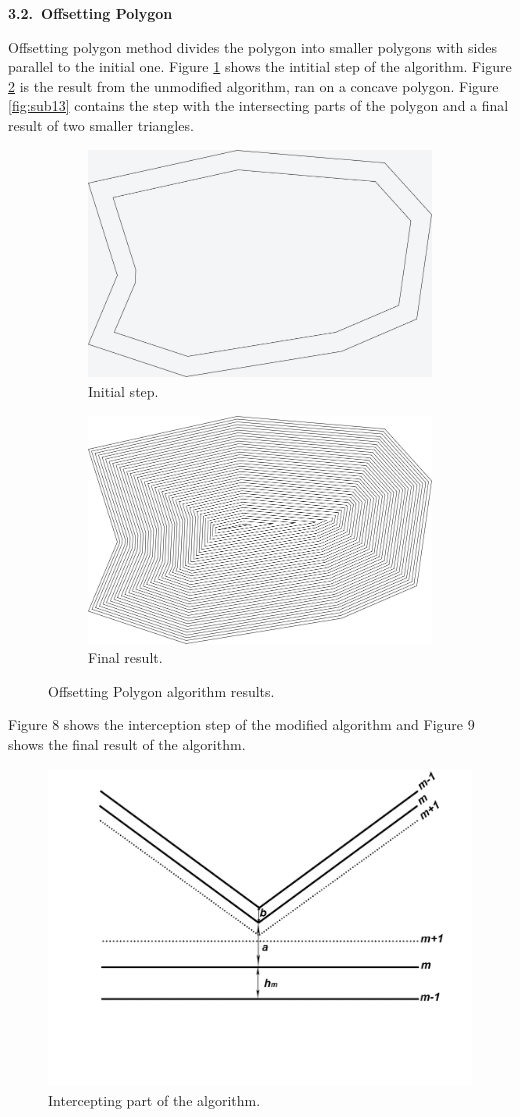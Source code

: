 \documentclass[11pt,leqno]{book}
\newcommand{\subsect}[1]{\vskip 3mm\par{\bf#1}}
\begin{document}
\subsect{3.2.~Offsetting Polygon}

Offsetting polygon method divides the polygon into smaller polygons with sides parallel to the initial one. Figure \ref{fig:sub11} shows the intitial step of the algorithm. Figure \ref{fig:sub12} is the result from the unmodified algorithm, ran on a concave polygon. Figure \ref{fig:sub13} contains the step with the intersecting parts of the polygon and a final result of two smaller triangles.

\begin{figure}[h!] 
\centering
\begin{subfigure}{.5\textwidth}
  \centering
  \includegraphics[width=.5\linewidth]{pic12.png}
  \caption{Initial step.}
  \label{fig:sub11}
\end{subfigure}
\begin{subfigure}{.5\textwidth}
  \centering
  \includegraphics[width=.5\linewidth]{pic13.png}
  \caption{Final result.}
  \label{fig:sub12}
\end{subfigure}
\caption{Offsetting Polygon algorithm results.}
\label{fig:seven}
\end{figure}
\FloatBarrier

Figure 8 shows the interception step of the modified algorithm and Figure 9 shows the final result of the algorithm.

\begin{figure}[h!]
  \centering
  \includegraphics[width=.6\linewidth]{pic15.png}
  \caption{Intercepting part of the algorithm.}
\end{figure}
\FloatBarrier
\end{document}
